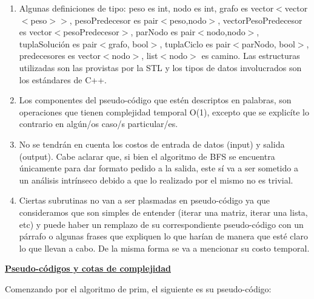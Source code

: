\documentclass[10pt,a4paper]{article}
\begin{document}
\begin{enumerate}
\item Algunas definiciones de tipo: peso es int, nodo es int, grafo es vector$<$vector$<$peso$>>$, pesoPredecesor es pair$<$peso,nodo$>$, vectorPesoPredecesor es vector$<$pesoPredecesor$>$, parNodo es pair$<$nodo,nodo$>$, tuplaSolución es pair$<$grafo, bool$>$, tuplaCiclo es pair$<$parNodo, bool$>$, predecesores es vector$<$nodo$>$, list$<$nodo$>$ es camino. Las estructuras utilizadas son las provistas por la STL y los tipos de datos involucrados son los estándares de C++.
\item Los componentes del pseudo-código que estén descriptos en palabras, son operaciones que tienen complejidad temporal O(1), excepto que se explicíte lo contrario en algún/os caso/s particular/es.
\item No se tendrán en cuenta los costos de entrada de datos (input) y salida (output). Cabe aclarar que, si bien el algoritmo de BFS se encuentra únicamente para dar formato pedido a la salida, este sí va a ser sometido a un análisis intrínseco debido a que lo realizado por el mismo no es trivial.
\item Ciertas subrutinas no van a ser plasmadas en pseudo-código ya que consideramos que son simples de entender (iterar una matriz, iterar una lista, etc) y puede haber un remplazo de su correspondiente pseudo-código con un párrafo o algunas frases que expliquen lo que harían de manera que esté claro lo que llevan a cabo. De la misma forma se va a mencionar su costo temporal.
\end{enumerate}

\noindent \textbf{\underline{Pseudo-códigos y cotas de complejidad}}

Comenzando por el algoritmo de prim, el siguiente es su pseudo-código:
\end{document}
